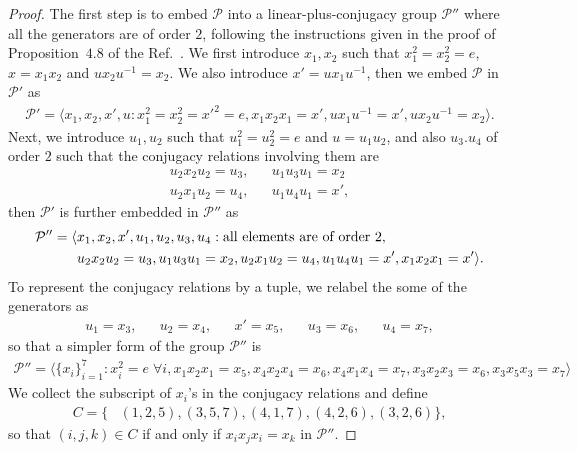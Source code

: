 \documentclass[11pt,letterpaper]{article}
\newcommand{\1}{\mathbb{1}}
\newcommand{\Pg}{\mathcal{P}}
\theoremstyle{definition}
\begin{document}
\begin{proof}
The first step is to embed $\Pg$ into a linear-plus-conjugacy group $\Pg''$ where
all the generators are of order $2$, following the instructions given in the proof of  
Proposition~$4.8$ of the Ref.~\cite{slofstra2017}.
We first introduce $x_1,x_2$ such that $x_1^2=x_2^2=e$, $x=x_1x_2$ and $u x_2 u^{-1}=x_2$.
We also introduce $x' = ux_1u^{-1}$, 
then we embed $\Pg$ in $\Pg'$ as
\begin{align}
	\Pg' = \langle x_1,x_2,x',u: x_1^2=x_2^2=x'^2=e,
	x_1x_2x_1=x', ux_1u^{-1}=x', ux_2u^{-1} =x_2 \rangle.
\end{align}
Next, we introduce $u_1,u_2$ such that $u_1^2=u_2^2=e$ and $u=u_1u_2$, 
and also $u_3.u_4$ of order $2$ such that the conjugacy relations involving them are 
\begin{align*}
u_2x_2u_2 = u_3, && u_1u_3u_1 = x_2\\
u_2x_1u_2 = u_4, && u_1u_4u_1 = x',
\end{align*}
then
$\Pg'$ is further embedded in $\Pg''$ as
\begin{equation}
\begin{aligned}
	\Pg'' =  \langle &x_1,x_2,x',u_1,u_2,u_3,u_4: \text{all elements are of order $2$},\notag\\
	 &u_2x_2u_2 = u_3, u_1u_3u_1 = x_2,
u_2x_1u_2 = u_4, u_1u_4u_1 = x',x_1x_2x_1=x' \rangle.
\end{aligned}
\end{equation}	
To represent the conjugacy relations by a tuple, we relabel the some of the generators as
\begin{align*}
	u_1 = x_3, && u_2 = x_4, && x' = x_5, && u_3 = x_6, && u_4 = x_7,
\end{align*}
so that a simpler form of the group $\Pg''$ is 
\begin{equation}
\begin{aligned}
	\Pg'' = \langle \{x_i\}_{i=1}^7 : x_i^2 = e \; \forall i, 
	x_1x_2x_1=x_5, x_4x_2x_4 = x_6,
	 x_4x_1x_4=x_7, x_3x_2x_3 = x_6, x_3x_5x_3=x_7\rangle
\end{aligned}
\end{equation}
We collect the subscript of $x_i$'s in the conjugacy relations and define
\begin{align}
	C= \{ &(1,2,5), (3,5,7), (4,1,7), (4,2,6), (3,2,6)\},
\end{align}
so that $(i,j,k) \in C$ if and only if $x_ix_jx_i = x_k$ in $\Pg''$.


\end{proof}
\end{document}
